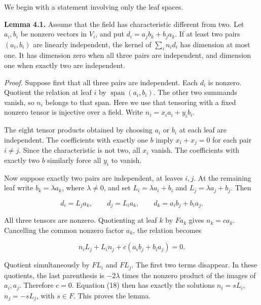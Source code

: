 \documentclass[11pt]{article}
\begin{document}
We begin with a statement involving only the leaf spaces.


\textbf{Lemma 4.1.} Assume that the field has characteristic different from two. Let $a_i,b_i$ be nonzero vectors in $V_i$, and put $d_i=a_jb_k+b_ja_k$. If at least two pairs $(a_i,b_i)$ are linearly independent, the kernel of $\sum_i n_id_i$ has dimension at most one. It has dimension zero when all three pairs are independent, and dimension one when exactly two are independent.


\nopagebreak[4]

\emph{Proof.} Suppose first that all three pairs are independent. Each $d_i$ is nonzero. Quotient the relation at leaf $i$ by $\operatorname{span}(a_i,b_i)$. The other two summands vanish, so $n_i$ belongs to that span. Here we use that tensoring with a fixed nonzero tensor is injective over a field. Write $n_i=x_i a_i+y_i b_i$.


The eight tensor products obtained by choosing $a_i$ or $b_i$ at each leaf are independent. The coefficients with exactly one $b$ imply $x_i+x_j=0$ for each pair $i\ne j$. Since the characteristic is not two, all $x_i$ vanish. The coefficients with exactly two $b$ similarly force all $y_i$ to vanish.


Now suppose exactly two pairs are independent, at leaves $i,j$. At the remaining leaf write $b_k=\lambda a_k$, where $\lambda\ne0$, and set $L_i=\lambda a_i+b_i$ and $L_j=\lambda a_j+b_j$. Then


\nopagebreak[4]

\begin{equation}
d_i=L_j a_k,\qquad d_j=L_i a_k,\qquad d_k=a_i b_j+b_i a_j.
\tag{17}
\end{equation}

All three tensors are nonzero. Quotienting at leaf $k$ by $F a_k$ gives $n_k=c a_k$. Cancelling the common nonzero factor $a_k$, the relation becomes


\nopagebreak[4]

\begin{equation}
n_iL_j+L_in_j+c(a_ib_j+b_ia_j)=0.
\tag{18}
\end{equation}

Quotient simultaneously by $F L_i$ and $F L_j$. The first two terms disappear. In these quotients, the last parenthesis is $-2\lambda$ times the nonzero product of the images of $a_i,a_j$. Therefore $c=0$. Equation (18) then has exactly the solutions $n_i=sL_i$, $n_j=-sL_j$, with $s\in F$. This proves the lemma.
\end{document}

